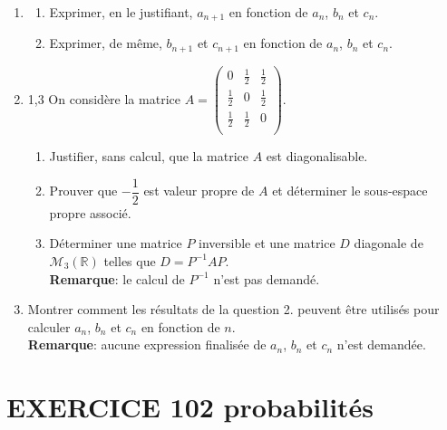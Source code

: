 \documentclass[10pt,oneside]{article}
\begin{document}
\begin{flushleft}
\begin{enumerate}
\item 
\begin{enumerate}
\item
Exprimer, en le justifiant, $a_{n+1}$ en fonction de $a_n$, $b_n$ et $c_n$.
\item Exprimer, de même, $b_{n+1}$ et $c_{n+1}$ en fonction de $a_n$, $b_n$ et $c_n$.

\end{enumerate}

\item
\begin{spacing}{1,3}
On considère la  matrice $A=\left( {\begin{array}{ccc}
  0&\frac{1}{2}&\frac{1}{2} \\ 
   \frac{1}{2}&0& \frac{1}{2}\\
  \frac{1}{2}&\frac{1}{2}&0 \\ 
  
\end{array}} \right)$.\\
\end{spacing}
\begin{enumerate}


\item 
Justifier, sans calcul, que la matrice $A$ est diagonalisable.
\item
Prouver que $-\dfrac{1}{2}$ est valeur propre de $A$ et déterminer le sous-espace propre associé.
\item
Déterminer une matrice $P$  inversible  et une matrice $D$  diagonale de $\mathcal{M}_3(\mathbb{R})$ telles que $D=P^{-1}AP$.\\
\textbf{Remarque}: le calcul de $P^{-1}$ n'est pas demandé.
\end{enumerate}
\item
Montrer comment les résultats de la question 2. peuvent être utilisés pour calculer $a_n$, $b_n$ et $c_n$ en fonction de $n$.\\
\textbf{Remarque}: aucune expression finalisée de $a_n$, $b_n$ et $c_n$ n'est demandée.
\end{enumerate}
\bigskip


\section*{EXERCICE 102 \:probabilités}


\end{flushleft}
\end{document}
